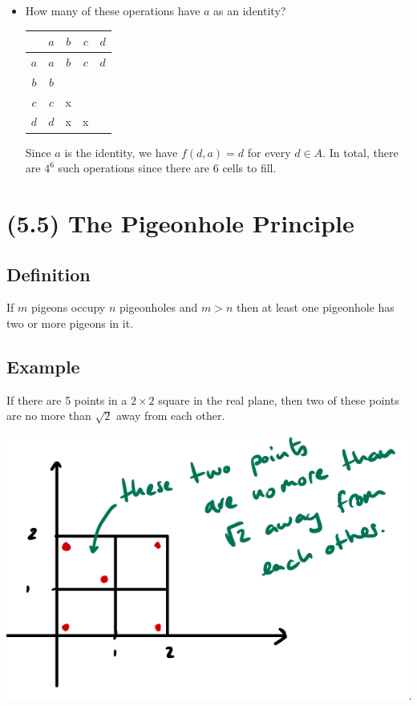 \documentclass[11pt]{article}
\begin{document}
\begin{itemize}
        \item How many of these operations have $a$ as an identity?
        \begin{center}
            \begin{tabular}{| c | c | c | c | c |} \hline
                     & $a$ & $b$ & $c$ & $d$ \\ \hline
                 $a$ & $a$ & $b$ & $c$ & $d$ \\ \hline
                 $b$ & $b$ &     &     &     \\ \hline
                 $c$ & $c$ &  x  &     &     \\ \hline
                 $d$ & $d$ &  x  &  x  &     \\ \hline
            \end{tabular}
        \end{center}
        Since $a$ is the identity, we have \(f(d,a) = d\) for every \(d \in A\). In total, there are \(4^6\) such operations since there are 6 cells to fill.
    \end{itemize}

    \pagebreak

    \section{(5.5) The Pigeonhole Principle}

    \subsection{Definition}

    If $m$ pigeons occupy $n$ pigeonholes and $m > n$ then at least one pigeonhole has two or more pigeons in it.

    \subsection{Example}

    If there are 5 points in a \(2 \times 2\) square in the real plane, then two of these points are no more than \(\sqrt{2}\) away from each other. 

    \begin{center}
        \includegraphics[scale=0.5]{ex.png}
    \end{center}
\end{document}
